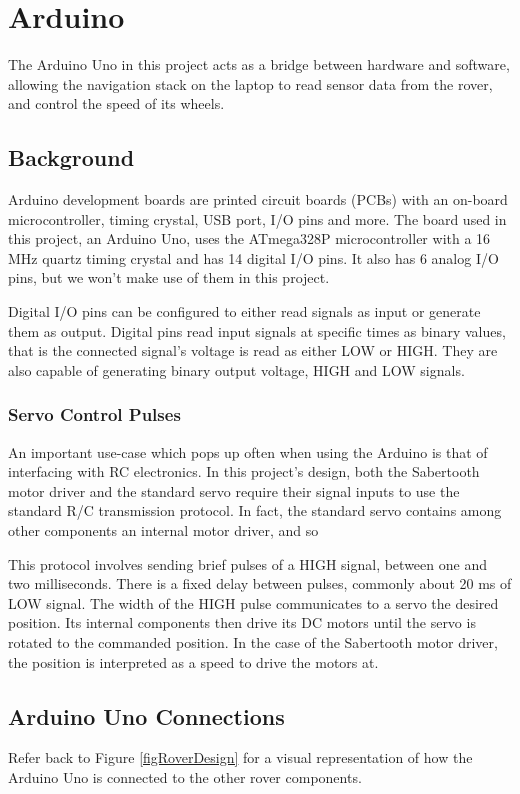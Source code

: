 \chapter{Arduino}

The Arduino Uno in this project acts as a bridge between hardware and software, allowing the navigation stack on the laptop to read sensor data from the rover, and control the speed of its wheels.

\section{Background}
Arduino development boards are printed circuit boards (PCBs) with an on-board microcontroller, timing crystal, USB port, I/O pins and more. The board used in this project, an Arduino Uno, uses the ATmega328P microcontroller with a 16 MHz quartz timing crystal and has 14 digital I/O pins. It also has 6 analog I/O pins, but we won't make use of them in this project. 

Digital I/O pins can be configured to either read signals as input or generate them as output. Digital pins read input signals at specific times as binary values, that is the connected signal's voltage is read as either LOW or HIGH. They are also capable of generating binary output voltage, HIGH and LOW signals.

\subsection{Servo Control Pulses} \label{sectionRCPulses}
An important use-case which pops up often when using the Arduino is that of interfacing with RC electronics. In this project's design, both the Sabertooth motor driver and the standard servo require their signal inputs to use the standard R/C transmission protocol. In fact, the standard servo contains among other components an internal motor driver, and so 

This protocol involves sending brief pulses of a HIGH signal, between one and two milliseconds. There is a fixed delay between pulses, commonly about 20 ms of LOW signal. The width of the HIGH pulse communicates to a servo the desired position. Its internal components then drive its DC motors until the servo is rotated to the commanded position. In the case of the Sabertooth motor driver, the position is interpreted as a speed to drive the motors at.

\section{Arduino Uno Connections}
Refer back to Figure \ref{figRoverDesign} for a visual representation of how the Arduino Uno is connected to the other rover components.

